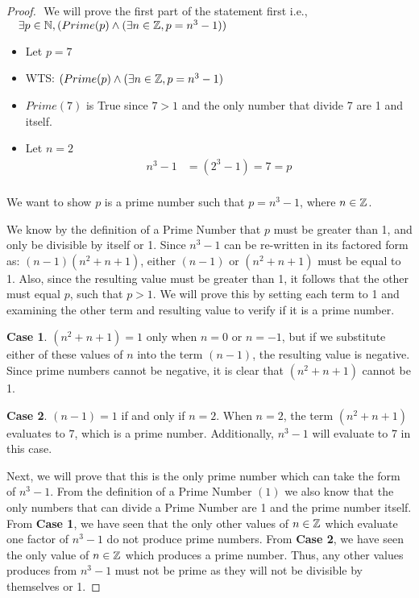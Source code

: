 \documentclass[12pt]{article}
\theoremstyle{definition}
\newtheorem{case}{Case}
\begin{document}
\begin{enumerate}
    \begin{proof} $ $\newline 
    We will prove the first part of the statement first i.e., \\
    $\quad  \exists p \in \mathbb N, (Prime(p) \land (\exists n \in \mathbb Z, p = n^3 - 1))$
    \begin{itemize}
        \item Let $p = 7$
        \item WTS: $(Prime(p) \land (\exists n \in \mathbb Z, p = n^3 - 1)$
        \item $Prime(7)$ is True since $7 > 1$ and the only number that divide 7 are 1 and itself.
        \item Let $n = 2$
        \begin{align*}
            n^{3} - 1 &= (2^{3} - 1) = 7 = p \\
        \end{align*}
    \end{itemize}
    We want to show $p$ is a prime number such that $p = n^3 - 1$, where $n \in \mathbb Z$.\
    
     We know by the definition of a Prime Number that $p$ must be greater than 1, and only be divisible by itself or 1. Since $n^3 - 1$ can be re-written in its factored form as: $(n - 1)(n^2 + n + 1)$, either $(n - 1)$ or $(n^2 + n + 1)$ must be equal to 1. Also, since the resulting value must be greater than 1, it follows that the other must equal $p$, such that $p > 1$. We will prove this by setting each term to 1 and examining the other term and resulting value to verify if it is a prime number.\
    
    \begin{case}
    $(n^2 + n + 1) = 1$ only when $n = 0$ or $n = -1$, but if we substitute either of these values of $n$ into the term $(n - 1)$, the resulting value is negative. Since prime numbers cannot be negative, it is clear that $(n^2 + n + 1)$ cannot be 1.\
    \end{case}
    \begin{case}
    $(n - 1) = 1$ if and only if $n = 2$. When $n = 2$, the term $(n^2 + n + 1)$ evaluates to $7$, which is a prime number. Additionally, $n^3 - 1$ will evaluate to 7 in this case.\
    \end{case}
    
    Next, we will prove that this is the only prime number which can take the form of $n^3 - 1$. From the definition of a Prime Number $(1)$ we also know that the only numbers that can divide a Prime Number are 1 and the prime number itself. From \textbf{Case 1}, we have seen that the only other values of $n \in \mathbb Z$ which evaluate one factor of $n^3 - 1$ do not produce prime numbers. From \textbf{Case 2}, we have seen the only value of $n \in \mathbb Z$ which produces a prime number. Thus, any other values produces from $n^3 - 1$ must not be prime as they will not be divisible by themselves or 1.
    
    
    \end{proof}
    
\end{enumerate}
\end{document}
